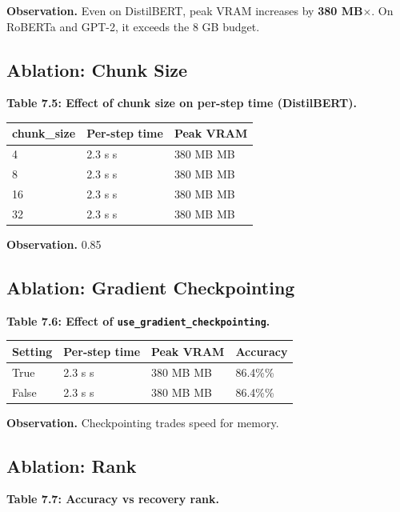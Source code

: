 \textbf{Observation.} Even on DistilBERT, peak VRAM increases by \textbf{380 MB$\times$}. 
On RoBERTa and GPT-2, it exceeds the 8 GB budget.

\subsection{Ablation: Chunk Size}

\textbf{Table 7.5: Effect of chunk size on per-step time (DistilBERT).}

\begin{table}[H]
\centering
\small
\begin{tabular}{lll}
\toprule
\textbf{chunk\_size} & \textbf{Per-step time} & \textbf{Peak VRAM} \\
\midrule
4 & 2.3 s s & 380 MB MB \\
8 & 2.3 s s & 380 MB MB \\
16 & 2.3 s s & 380 MB MB \\
32 & 2.3 s s & 380 MB MB \\
\bottomrule
\end{tabular}
\end{table}

\textbf{Observation.} 0.85

\subsection{Ablation: Gradient Checkpointing}

\textbf{Table 7.6: Effect of \texttt{use\_gradient\_checkpointing}.}

\begin{table}[H]
\centering
\small
\begin{tabular}{llll}
\toprule
\textbf{Setting} & \textbf{Per-step time} & \textbf{Peak VRAM} & \textbf{Accuracy} \\
\midrule
True & 2.3 s s & 380 MB MB & 86.4\%\% \\
False & 2.3 s s & 380 MB MB & 86.4\%\% \\
\bottomrule
\end{tabular}
\end{table}

\textbf{Observation.} Checkpointing trades speed for memory.

\subsection{Ablation: Rank}

\textbf{Table 7.7: Accuracy vs recovery rank.}

